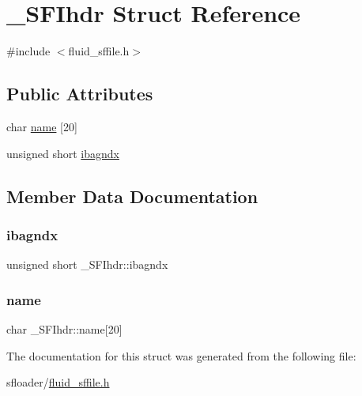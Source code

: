 \hypertarget{struct__SFIhdr}{}\section{\+\_\+\+S\+F\+Ihdr Struct Reference}
\label{struct__SFIhdr}


{\ttfamily \#include $<$fluid\+\_\+sffile.\+h$>$}

\subsection*{Public Attributes}
\begin{DoxyCompactItemize}
\item 
char \hyperlink{struct__SFIhdr_a4ecb777a7eba167880083758a26d2406}{name} \mbox{[}20\mbox{]}
\item 
unsigned short \hyperlink{struct__SFIhdr_aaa6ee4515ca0a2125f3d713c287e3ab8}{ibagndx}
\end{DoxyCompactItemize}


\subsection{Member Data Documentation}
\mbox{\label{struct__SFIhdr_aaa6ee4515ca0a2125f3d713c287e3ab8}} 
\subsubsection{\texorpdfstring{ibagndx}{ibagndx}}
{\footnotesize\ttfamily unsigned short \+\_\+\+S\+F\+Ihdr\+::ibagndx}

\mbox{\label{struct__SFIhdr_a4ecb777a7eba167880083758a26d2406}} 
\subsubsection{\texorpdfstring{name}{name}}
{\footnotesize\ttfamily char \+\_\+\+S\+F\+Ihdr\+::name\mbox{[}20\mbox{]}}



The documentation for this struct was generated from the following file\+:\begin{DoxyCompactItemize}
\item 
sfloader/\hyperlink{fluid__sffile_8h}{fluid\+\_\+sffile.\+h}\end{DoxyCompactItemize}

